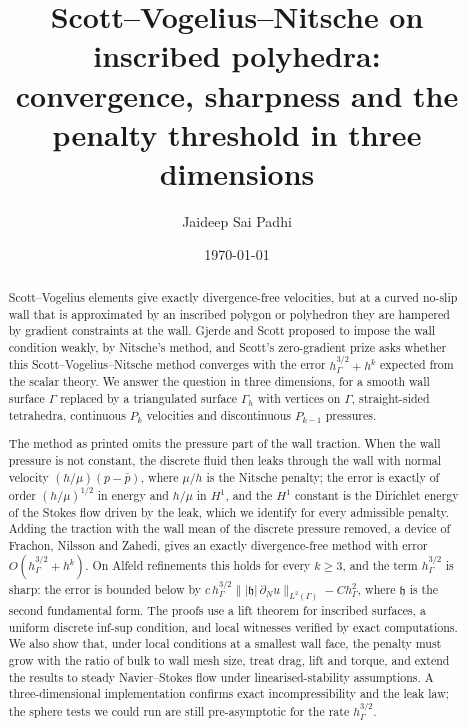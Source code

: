 \documentclass[11pt,reqno]{amsart}
\theoremstyle{plain}
\theoremstyle{definition}
\newcommand{\hG}{h_\Gamma}
\newcommand{\Gh}{\Gamma_h}
\newcommand{\pbar}{\bar p}
\newcommand{\norm}[1]{\lVert #1\rVert}
\newcommand{\hh}{\mathfrak h}
\begin{document}
\title[Scott--Vogelius--Nitsche on inscribed polyhedra]{Scott--Vogelius--Nitsche on inscribed polyhedra:\\ convergence, sharpness and the penalty threshold in three dimensions}
\author{Jaideep Sai Padhi}
\address{Department of Computer Science, Purdue University, West Lafayette, IN 47907, USA}
\date{\today}

\begin{abstract}
Scott--Vogelius elements give exactly divergence-free velocities, but at a curved no-slip wall that is approximated by an inscribed polygon or polyhedron they are hampered by gradient constraints at the wall. Gjerde and Scott proposed to impose the wall condition weakly, by Nitsche's method, and Scott's zero-gradient prize asks whether this Scott--Vogelius--Nitsche method converges with the error $\hG^{3/2}+h^k$ expected from the scalar theory. We answer the question in three dimensions, for a smooth wall surface $\Gamma$ replaced by a triangulated surface $\Gh$ with vertices on $\Gamma$, straight-sided tetrahedra, continuous $P_k$ velocities and discontinuous $P_{k-1}$ pressures.

The method as printed omits the pressure part of the wall traction. When the wall pressure is not constant, the discrete fluid then leaks through the wall with normal velocity $(h/\mu)(p-\pbar)$, where $\mu/h$ is the Nitsche penalty; the error is exactly of order $(h/\mu)^{1/2}$ in energy and $h/\mu$ in $H^1$, and the $H^1$ constant is the Dirichlet energy of the Stokes flow driven by the leak, which we identify for every admissible penalty. Adding the traction with the wall mean of the discrete pressure removed, a device of Frachon, Nilsson and Zahedi, gives an exactly divergence-free method with error $O(\hG^{3/2}+h^k)$. On Alfeld refinements this holds for every $k\ge3$, and the term $\hG^{3/2}$ is sharp: the error is bounded below by $c\,\hG^{3/2}\norm{|\hh|\,\partial_Nu}_{L^2(\Gamma)}-C\hG^2$, where $\hh$ is the second fundamental form. The proofs use a lift theorem for inscribed surfaces, a uniform discrete inf-sup condition, and local witnesses verified by exact computations. We also show that, under local conditions at a smallest wall face, the penalty must grow with the ratio of bulk to wall mesh size, treat drag, lift and torque, and extend the results to steady Navier--Stokes flow under linearised-stability assumptions. A three-dimensional implementation confirms exact incompressibility and the leak law; the sphere tests we could run are still pre-asymptotic for the rate $\hG^{3/2}$.
\end{abstract}
\end{document}
